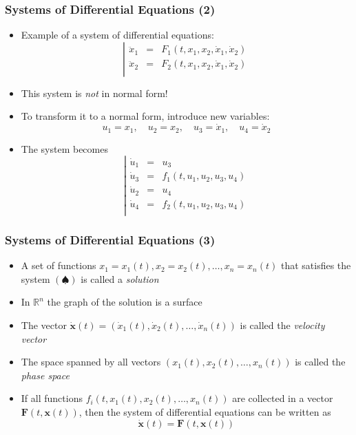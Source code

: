 \documentclass[10pt,usenames,dvipsnames]{beamer}
\theoremstyle{definition}
\begin{document}
\begin{frame}[fragile]
	\frametitle{Systems of Differential Equations (2)}
	\begin{itemize}
		\color{blue}
		\item Example of a system of differential equations:
		\[
			\left|
			\begin{array}{lcl}
				\ddot{x}_{1} & = & F_{1}(t, x_{1}, x_{2},\dot{x}_{1}, \dot{x}_{2})\\
				\ddot{x}_{2} & = & F_{2}(t, x_{1}, x_{2},\dot{x}_{1}, \dot{x}_{2})\\
			\end{array}\right.
		\]
		
		\color{black}
		\item This system is \textit{not} in normal form!
		
		\item To transform it to a normal form, introduce new variables:
		\[
			u_{1} = x_{1}, \quad u_{2} = x_{2}, \quad u_{3} = \dot{x}_{1}, \quad u_{4} = \dot{x}_{2}
		\]
		
		\item The system becomes
		\[
		\left|
		\begin{array}{lcl}
			\dot{u}_{1} & = & u_{3}\\
			\dot{u}_{3} & = & f_{1}(t, u_{1}, u_{2}, u_{3}, u_{4})\\
			\dot{u}_{2} & = & u_{4}\\
			\dot{u}_{4} & = & f_{2}(t, u_{1}, u_{2}, u_{3}, u_{4})\\	
		\end{array}\right.
		\]
	\end{itemize}
\end{frame}

\begin{frame}[fragile]
	\frametitle{Systems of Differential Equations (3)}
	\begin{itemize}
		\item A set of functions $ x_{1} = x_{1}(t), x_{2} = x_{2}(t), \ldots, x_{n} = x_{n}(t) $ that satisfies the system $ (\spadesuit) $ is called a \textit{solution}
		
		\item In $ \mathbb{R}^{n} $ the graph of the solution is a surface
		
		\item The vector $ \dot{\mathbf{x}}(t) = (\dot{x}_{1}(t), \dot{x}_{2}(t), \ldots, \dot{x}_{n}(t))$ is called the \textit{velocity vector}
		
		\item The space spanned by all vectors $ (x_{1}(t), x_{2}(t), \ldots, x_{n}(t)) $ is called the \textit{phase space}
		
		\item If all functions $ f_{i}(t, x_{1}(t), x_{2}(t),\ldots, x_{n}(t)) $ are collected in a vector $ \mathbf{F}(t, \mathbf{x}(t)) $, then the system of differential equations can be written as
		\[
			\dot{\mathbf{x}}(t) = \mathbf{F}(t, \mathbf{x}(t))
		\]
	\end{itemize}
\end{frame}
\end{document}
